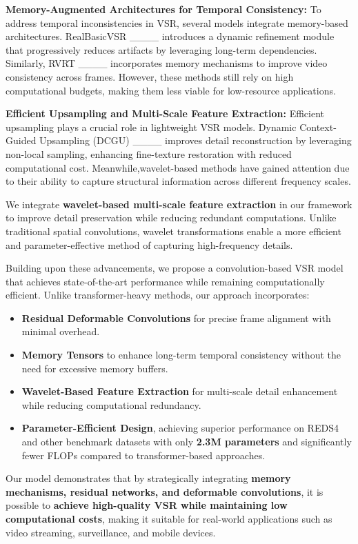 
\textbf{Memory-Augmented Architectures for Temporal Consistency:}  
To address temporal inconsistencies in VSR, several models integrate memory-based architectures. RealBasicVSR ____ introduces a dynamic refinement module that progressively reduces artifacts by leveraging long-term dependencies. Similarly, RVRT ____ incorporates memory mechanisms to improve video consistency across frames. However, these methods still rely on high computational budgets, making them less viable for low-resource applications.  


\textbf{Efficient Upsampling and Multi-Scale Feature Extraction:}  
Efficient upsampling plays a crucial role in lightweight VSR models. Dynamic Context-Guided Upsampling (DCGU) ____ improves detail reconstruction by leveraging non-local sampling, enhancing fine-texture restoration with reduced computational cost. Meanwhile,wavelet-based methods have gained attention due to their ability to capture structural information across different frequency scales.  

We integrate \textbf{wavelet-based multi-scale feature extraction} in our framework to improve detail preservation while reducing redundant computations. Unlike traditional spatial convolutions, wavelet transformations enable a more efficient and parameter-effective method of capturing high-frequency details.

Building upon these advancements, we propose a convolution-based VSR model that achieves state-of-the-art performance while remaining computationally efficient. Unlike transformer-heavy methods, our approach incorporates:
\begin{itemize}
    \item \textbf{Residual Deformable Convolutions} for precise frame alignment with minimal overhead.
    \item \textbf{Memory Tensors} to enhance long-term temporal consistency without the need for excessive memory buffers.
    \item \textbf{Wavelet-Based Feature Extraction} for multi-scale detail enhancement while reducing computational redundancy.
    \item \textbf{Parameter-Efficient Design}, achieving superior performance on REDS4 and other benchmark datasets with only \textbf{2.3M parameters} and significantly fewer FLOPs compared to transformer-based approaches.
\end{itemize}

Our model demonstrates that by strategically integrating \textbf{memory mechanisms, residual networks, and deformable convolutions}, it is possible to \textbf{achieve high-quality VSR while maintaining low computational costs}, making it suitable for real-world applications such as video streaming, surveillance, and mobile devices.